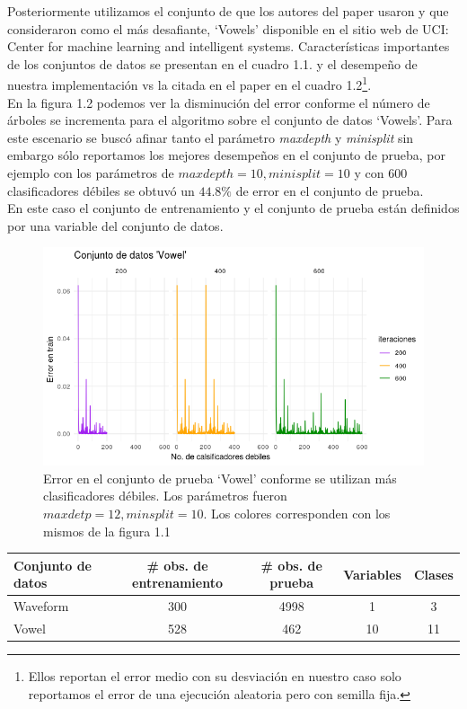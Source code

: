 \documentclass[paper=letter, fontsize=11pt]{scrartcl}
\numberwithin{equation}{section} %
\numberwithin{figure}{section} %
\numberwithin{table}{section} %
\begin{document}
Posteriormente utilizamos el conjunto de que los autores del paper usaron y que consideraron como el más desafiante, ‘Vowels’ disponible en el sitio web de UCI: Center for machine learning and intelligent systems.
Características importantes de los conjuntos de datos se presentan en el cuadro 1.1. y el desempeño de nuestra implementación vs la citada en el paper en el cuadro 1.2\footnote{Ellos reportan el error medio con su desviación en nuestro caso solo reportamos el error de una ejecución aleatoria pero con semilla fija.}.\\

En la figura 1.2 podemos ver la disminución del error conforme el número de árboles se incrementa para el algoritmo sobre el conjunto de datos ‘Vowels’. Para este escenario se buscó afinar tanto el parámetro \textit{maxdepth} y \textit{minisplit} sin embargo sólo reportamos los mejores desempeños en el conjunto de prueba, por ejemplo con los parámetros de $maxdepth=10, minisplit=10$ y con 600 clasificadores débiles se obtuvó un $44.8\%$ de error en el conjunto de prueba.    \\
En este caso el conjunto de entrenamiento y el conjunto de prueba están definidos por una variable del conjunto de datos.
\begin{figure}[H]
  \begin{center}
    \includegraphics[width=12cm]{vowel_error_train.png}
    \caption{Error en el conjunto de prueba ‘Vowel’ conforme se utilizan más clasificadores débiles. Los parámetros fueron $maxdetp=12, minsplit = 10$. 
Los colores corresponden con los mismos de la figura 1.1 }
    \label{figura1_2}
  \end{center}
\end{figure}
\FloatBarrier

\begin{minipage}{\linewidth}
\centering
\begin{tabular}{l|c|c|c|c}\hline
Conjunto de datos  & \# obs. de entrenamiento & \# obs. de prueba  & Variables & Clases \\ \hline
Waveform & 300 & 4998 & 1 & 3 \\
Vowel & 528 & 462 & 10 & 11\\ \hline
\end {tabular}
\label{descripcion} 
\end{minipage}
\end{document}
